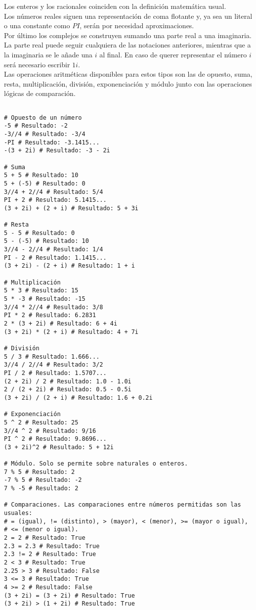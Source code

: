 Los enteros y los racionales coinciden con la definición matemática usual.\\
Los números reales siguen una representación de coma flotante y, ya sea un literal o una constante como $PI$, serán por necesidad aproximaciones.\\
Por último los complejos se construyen sumando una parte real a una imaginaria. La parte real puede seguir cualquiera de las notaciones anteriores, mientras que a la imaginaria se le añade una $i$ al final. En caso de querer representar el número $i$ será necesario escribir $1i$.\\


Las operaciones aritméticas disponibles para estos tipos son las de opuesto, suma, resta, multiplicación, división, exponenciación y módulo junto con las operaciones lógicas de comparación.
\begin{lstlisting}[style=tail, caption={Operaciones con expresiones numéricas}]

# Opuesto de un número
-5 # Resultado: -2
-3//4 # Resultado: -3/4
-PI # Resultado: -3.1415...
-(3 + 2i) # Resultado: -3 - 2i

# Suma
5 + 5 # Resultado: 10
5 + (-5) # Resultado: 0
3//4 + 2//4 # Resultado: 5/4
PI + 2 # Resultado: 5.1415...
(3 + 2i) + (2 + i) # Resultado: 5 + 3i

# Resta
5 - 5 # Resultado: 0
5 - (-5) # Resultado: 10
3//4 - 2//4 # Resultado: 1/4
PI - 2 # Resultado: 1.1415...
(3 + 2i) - (2 + i) # Resultado: 1 + i

# Multiplicación
5 * 3 # Resultado: 15
5 * -3 # Resultado: -15
3//4 * 2//4 # Resultado: 3/8
PI * 2 # Resultado: 6.2831
2 * (3 + 2i) # Resultado: 6 + 4i
(3 + 2i) * (2 + i) # Resultado: 4 + 7i

# División
5 / 3 # Resultado: 1.666...
3//4 / 2//4 # Resultado: 3/2
PI / 2 # Resultado: 1.5707...
(2 + 2i) / 2 # Resultado: 1.0 - 1.0i
2 / (2 + 2i) # Resultado: 0.5 - 0.5i
(3 + 2i) / (2 + i) # Resultado: 1.6 + 0.2i

# Exponenciación
5 ^ 2 # Resultado: 25
3//4 ^ 2 # Resultado: 9/16
PI ^ 2 # Resultado: 9.8696...
(3 + 2i)^2 # Resultado: 5 + 12i

# Módulo. Solo se permite sobre naturales o enteros.
7 % 5 # Resultado: 2
-7 % 5 # Resultado: -2
7 % -5 # Resultado: 2

# Comparaciones. Las comparaciones entre números permitidas son las usuales:
# = (igual), != (distinto), > (mayor), < (menor), >= (mayor o igual),
# <= (menor o igual).
2 = 2 # Resultado: True
2.3 = 2.3 # Resultado: True
2.3 != 2 # Resultado: True
2 < 3 # Resultado: True
2.25 > 3 # Resultado: False
3 <= 3 # Resultado: True
4 >= 2 # Resultado: False
(3 + 2i) = (3 + 2i) # Resultado: True
(3 + 2i) > (1 + 2i) # Resultado: True
\end{lstlisting}

